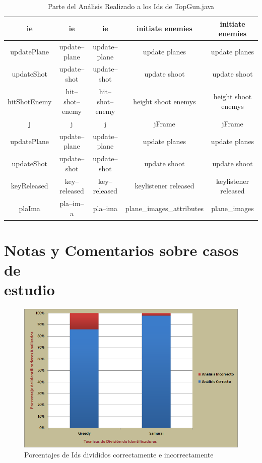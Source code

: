 \begin{table}
\begin{tabular}{| c | c | c | c | c |}
ie&ie&ie&initiate enemies&initiate enemies\\ \hline
updatePlane&update--plane&update--plane&update planes&update planes\\ \hline
updateShot&update--shot&update--shot&update shoot&update shoot\\ \hline
hitShotEnemy&hit--shot--enemy&hit--shot--enemy&height shoot enemys&height shoot enemys\\ \hline
j&j&j&jFrame&jFrame\\ \hline
updatePlane&update--plane&update--plane&update planes&update planes\\ \hline
updateShot&update--shot&update--shot&update shoot&update shoot\\ \hline
keyReleased&key--released&key--released&keylistener released&keylistener released\\ \hline
plaIma&pla--im--a&pla--ima&plane\_images\_attributes&plane\_images \\ \hline
   
   	\end{tabular}  
	 
   \caption{Parte del Análisis Realizado a los Ids de TopGun.java}
   \label{tabla7}
     
\end{table} 

\clearpage %

\section{Notas y Comentarios sobre casos de\\ estudio}

\begin{figure}[t!] %
\centerline{%
\includegraphics[scale= 0.66]{./cap5/barras_01.png}
}
\caption{Porcentajes de Ids divididos correctamente e incorrectamente}
\label{barras01}
\end{figure}

